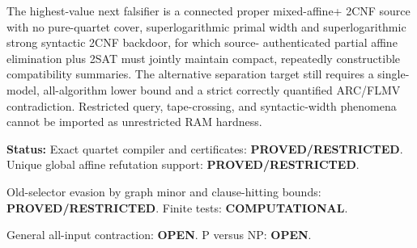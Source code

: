 \documentclass[11pt]{article}
\begin{document}
The highest-value next falsifier is a connected proper mixed-affine+
2CNF source with no pure-quartet cover, superlogarithmic primal width
and superlogarithmic strong syntactic 2CNF backdoor, for which source-
authenticated partial affine elimination plus 2SAT must jointly
maintain compact, repeatedly constructible compatibility summaries.
The alternative separation target still requires a single-model,
all-algorithm lower bound and a strict correctly quantified ARC/FLMV
contradiction.  Restricted query, tape-crossing, and syntactic-width
phenomena cannot be imported as unrestricted RAM hardness.

\noindent\textbf{Status:} Exact quartet compiler and certificates:
\textbf{PROVED/RESTRICTED}. Unique global affine refutation support:
\textbf{PROVED/RESTRICTED}.\par
\noindent Old-selector evasion by graph minor and clause-hitting bounds:
\textbf{PROVED/RESTRICTED}. Finite tests: \textbf{COMPUTATIONAL}.\par
\noindent General all-input contraction: \textbf{OPEN}.
P versus NP: \textbf{OPEN}.

\nocite{*}


\end{document}
